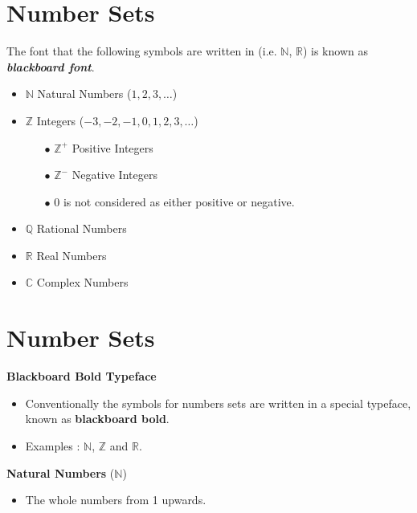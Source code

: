 \documentclass[11pt,a4paper,titlepage,oneside,openany]{article}
\numberwithin{equation}{section}
\numberwithin{algorithm}{section}
\numberwithin{figure}{section}
\numberwithin{table}{section}
\begin{document}
{%
\section*{Number Sets}
The font that the following symbols are written in (i.e. $\mathbb{N}$, $\mathbb{R}$) is known as \textit{\textbf{blackboard font}}.
\begin{itemize}
\item $\mathbb{N}$ Natural Numbers ($1,2,3,\ldots$) 
\item $\mathbb{Z}$ Integers ($-3,-2,-1,0,1,2,3, \ldots$)
\begin{itemize}
\item[$\bullet$] $\mathbb{Z}^{+}$ Positive Integers
\item[$\bullet$] $\mathbb{Z}^{-}$ Negative Integers
\item[$\bullet$] 0 is not considered as either positive or negative.
\end{itemize}
\item $\mathbb{Q}$ Rational Numbers
\item $\mathbb{R}$ Real Numbers
\item $\mathbb{C}$ Complex Numbers
\end{itemize}





\section{Number Sets}

\textbf{Blackboard Bold Typeface}

\begin{itemize}
\item Conventionally the symbols for numbers sets are written in a special typeface, known as \textbf{blackboard bold}.
\item Examples : $\mathbb{N}$, $\mathbb{Z}$ and $\mathbb{R}$.

\end{itemize}


\textbf{Natural Numbers} ($\mathbb{N}$)
\begin{itemize}
\item The whole numbers from 1 upwards. 


\end{itemize}}
\end{document}
